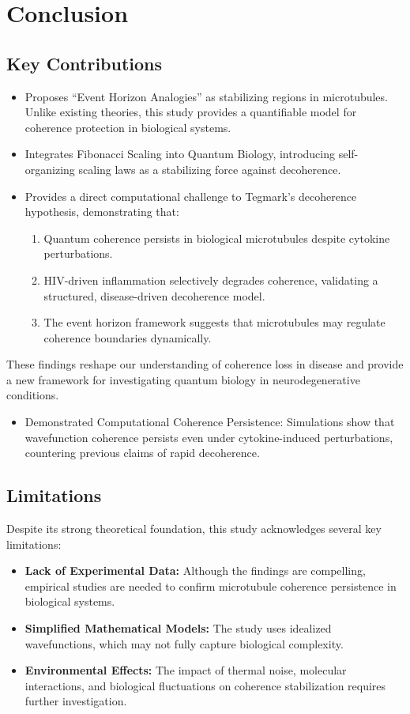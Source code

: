 \section{Conclusion}
\subsection{Key Contributions}
\begin{itemize}
\item Proposes “Event Horizon Analogies” as stabilizing regions in microtubules. Unlike existing theories, this study provides a quantifiable model for coherence protection in biological systems.
 \item Integrates Fibonacci Scaling into Quantum Biology, introducing self-organizing scaling laws as a stabilizing force against decoherence.
\item Provides a direct computational challenge to Tegmark’s decoherence hypothesis, demonstrating that:
\begin{enumerate}
\item Quantum coherence persists in biological microtubules despite cytokine perturbations.
    \item HIV-driven inflammation selectively degrades coherence, validating a structured, disease-driven decoherence model.
    \item The event horizon framework suggests that microtubules may regulate coherence boundaries dynamically.
\end{enumerate}
\end{itemize}
These findings reshape our understanding of coherence loss in disease and provide a new framework for investigating quantum biology in neurodegenerative conditions.
\begin{itemize}
        \item Demonstrated Computational Coherence Persistence: Simulations show that wavefunction coherence persists even under cytokine-induced perturbations, countering previous claims of rapid decoherence.
\end{itemize}
\subsection{Limitations}
Despite its strong theoretical foundation, this study acknowledges several key limitations:
\begin{itemize}
    \item \textbf{Lack of Experimental Data:} Although the findings are compelling, empirical studies are needed to confirm microtubule coherence persistence in biological systems.
    \item \textbf{Simplified Mathematical Models:} The study uses idealized wavefunctions, which may not fully capture biological complexity.
    \item \textbf{Environmental Effects:} The impact of thermal noise, molecular interactions, and biological fluctuations on coherence stabilization requires further investigation.
\end{itemize}
